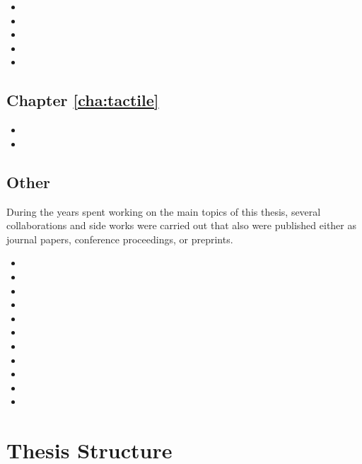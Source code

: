 \begin{itemize}
  \item {}
  \item {}
  \item {}
  \item {}
  \item {}
\end{itemize}

\subsection{Chapter \ref{cha:tactile}}

\begin{itemize}
  \item {}
  \item {}
\end{itemize}

\subsection{Other}

During the years spent working on the main topics of this thesis, several collaborations and side works were carried out that also were published either as journal papers, conference proceedings, or preprints. 

\begin{itemize}
  \item {}
  \item {}
  \item {}
  \item {}
  \item {}
  \item {}
  \item {}
  \item {}
  \item {}
  \item {}
  \item {}
\end{itemize}

\section{Thesis Structure}
\label{cha:introduction:sec:structure}

